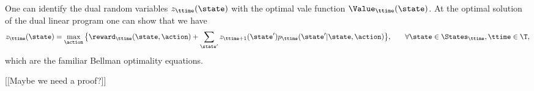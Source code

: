 \begin{leftbar}
One can identify the dual random variables $z_\ttime(\state)$ with
the optimal vale function $\Value_\ttime(\state)$. At the optimal
solution of the dual linear program one can show that we have
\begin{align*}
 z_{\ttime}(\state) &= \max_\action \big\{
\reward_{\ttime}(\state,\action) + \sum_{\state'}z_{\ttime +
1}(\state')p_{\ttime}(\state'|\state,\action) \big\} , &\quad\forall
\state \in {\States_{\ttime}}, \ttime\in\T,
\end{align*}
which are the familiar Bellman optimality equations.

[[Maybe we need a proof?]]

%
%
%
%

\end{leftbar}


